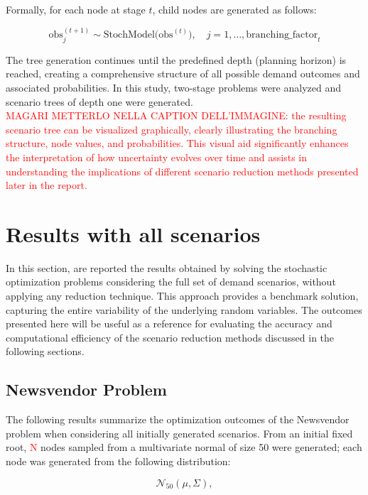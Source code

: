 \documentclass[a4paper,12pt]{article}
\begin{document}
	Formally, for each node at stage $t$, child nodes are generated as follows:
	
	\[
	\text{obs}^{(t+1)}_j \sim \text{StochModel}\bigl(\text{obs}^{(t)}\bigr), \quad j=1, \dots, \text{branching\_factor}_t
	\]
	
	The tree generation continues until the predefined depth (planning horizon) is reached, creating a comprehensive structure of all possible demand outcomes and associated probabilities. In this study, two-stage problems were analyzed and scenario trees of depth one were generated.\\
	
\textcolor{red}{MAGARI METTERLO NELLA CAPTION DELL'IMMAGINE:}	
\textcolor{red}{the resulting scenario tree can be visualized graphically, clearly illustrating the branching structure, node values, and probabilities. This visual aid significantly enhances the interpretation of how uncertainty evolves over time and assists in understanding the implications of different scenario reduction methods presented later in the report.}
	
	\section{Results with all scenarios}
	
	In this section, are reported the results obtained by solving the stochastic optimization problems considering the full set of demand scenarios, without applying any reduction technique. This approach provides a benchmark solution, capturing the entire variability of the underlying random variables. The outcomes presented here will be useful as a reference for evaluating the accuracy and computational efficiency of the scenario reduction methods discussed in the following sections.
	
	
	\subsection{Newsvendor Problem}
	
	The following results summarize the optimization outcomes of the Newsvendor problem when considering all initially generated scenarios. From an initial fixed root, \textcolor{red}{N} nodes sampled from a multivariate normal of size 50 were generated; each node was generated from the following distribution: 
	
	\[
	\mathcal{N}_{50}(\mu, \Sigma),
	\]
	
\end{document}
